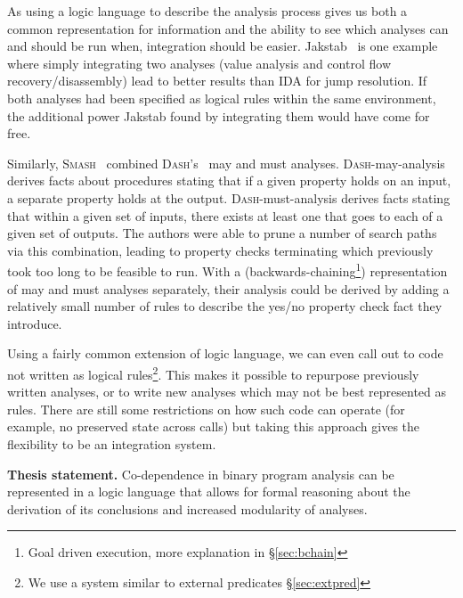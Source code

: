 As using a logic language to describe the analysis process gives us both a common representation for information and the ability to see which analyses can and should be run when, integration should be easier.
Jakstab~\cite{jakstab} is one example where simply integrating two analyses (value analysis and control flow recovery/disassembly) lead to better results than IDA\cite{ida} for jump resolution.
If both analyses had been specified as logical rules within the same environment, the additional power Jakstab found by integrating them would have come for free.

Similarly, \textsc{Smash}~\cite{smash} combined \textsc{Dash}'s~\cite{dash} may and must analyses.
\textsc{Dash}-may-analysis derives facts about procedures stating that if a given property holds on an input, a separate property holds at the output.
\textsc{Dash}-must-analysis derives facts stating that within a given set of inputs, there exists at least one that goes to each of a given set of outputs.
The authors were able to prune a number of search paths via this combination, leading to property checks terminating which previously took too long to be feasible to run.
With a (backwards-chaining\footnote{Goal driven execution, more explanation in \S\ref{sec:bchain}}) representation of may and must analyses separately, their analysis could be derived by adding a relatively small number of rules to describe the yes/no property check fact they introduce.

Using a fairly common extension of logic language, we can even call out to code not written as logical rules\footnote{We use a system similar to external predicates \S\ref{sec:extpred}}.
This makes it possible to repurpose previously written analyses, or to write new analyses which may not be best represented as rules.
There are still some restrictions on how such code can operate (for example, no preserved state across calls) but taking this approach gives the flexibility to be an integration system.

\begin{inset}
{\bf Thesis statement.}
Co-dependence in binary program analysis can be represented in a logic language that allows for formal reasoning about the derivation of its conclusions and increased modularity of analyses.
\end{inset}

